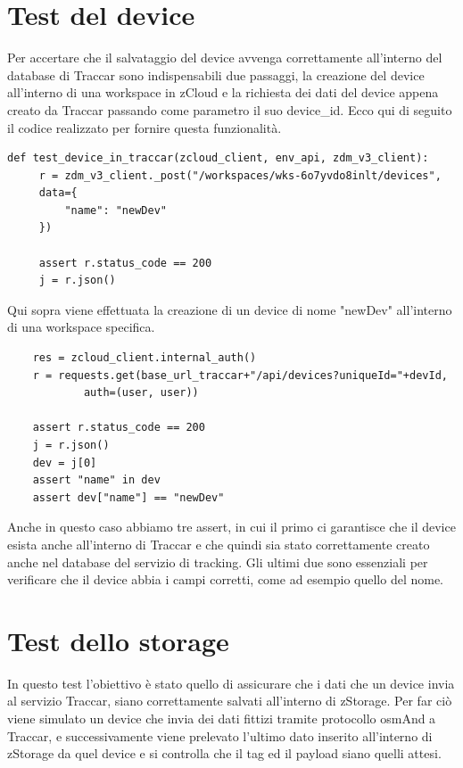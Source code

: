 \documentclass[a4paper,titlepage,12pt]{report}
\begin{document}
{\section{
Test del device}
Per accertare che il salvataggio del device avvenga correttamente all'interno del database di Traccar sono indispensabili due passaggi, la creazione del device all'interno di una workspace in zCloud e la richiesta dei dati del device appena creato da Traccar passando come parametro il suo device\_id. Ecco qui di seguito il codice realizzato per fornire questa funzionalità.

\begin{verbatim}
def test_device_in_traccar(zcloud_client, env_api, zdm_v3_client):
     r = zdm_v3_client._post("/workspaces/wks-6o7yvdo8inlt/devices",
     data={
         "name": "newDev"
     })
     
     assert r.status_code == 200
     j = r.json()
\end{verbatim}

\noindent Qui sopra viene effettuata la creazione di un device di nome "newDev" all'interno di una workspace specifica.

\begin{verbatim}
    res = zcloud_client.internal_auth()
    r = requests.get(base_url_traccar+"/api/devices?uniqueId="+devId,
    		auth=(user, user))
    		
    assert r.status_code == 200
    j = r.json()
    dev = j[0]
    assert "name" in dev
    assert dev["name"] == "newDev" 
\end{verbatim}

\noindent Anche in questo caso abbiamo tre assert, in cui il primo ci garantisce che il device esista anche all'interno di Traccar e che quindi sia stato correttamente creato anche nel database del servizio di tracking. Gli ultimi due sono essenziali per verificare che il device abbia i campi corretti, come ad esempio quello del nome.


\section{
Test dello storage}
In questo test l'obiettivo è stato quello di assicurare che i dati che un device invia al servizio Traccar, siano correttamente salvati all'interno di zStorage. Per far ciò viene simulato un device che invia dei dati fittizi tramite protocollo osmAnd a Traccar, e successivamente viene prelevato l'ultimo dato inserito all'interno di zStorage da quel device e si controlla che il tag ed il payload siano quelli attesi.


}
\end{document}
